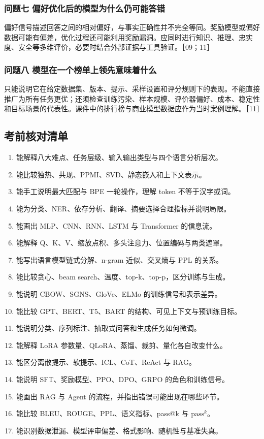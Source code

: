 \documentclass[UTF8,a4paper,zihao=-4,fontset=windows]{ctexart}
\begin{document}
\subsubsection*{问题七 偏好优化后的模型为什么仍可能答错}
偏好信号描述回答之间的相对偏好，与事实正确性并不完全等同。奖励模型或偏好数据可能有偏差，优化过程还可能利用奖励漏洞。应同时进行知识、推理、忠实度、安全等多维评价，必要时结合外部证据与工具验证。［09；11］

\subsubsection*{问题八 模型在一个榜单上领先意味着什么}
只能说明它在给定数据集、版本、提示、采样设置和评分规则下的表现。不能直接推广为所有任务更优；还须检查训练污染、样本规模、评价器偏好、成本、稳定性和目标场景的代表性。课件中的排行榜与商业模型数据应作为当时案例理解。［11］

\subsection*{考前核对清单}
\begin{enumerate}
\item {}能解释八大难点、任务层级、输入输出类型与四个语言分析层次。
\item {}能比较独热、共现、PPMI、SVD、静态嵌入和上下文表示。
\item {}能手工说明最大匹配与 BPE 一轮操作，理解 token 不等于汉字或词。
\item {}能为分类、NER、依存分析、翻译、摘要选择合理指标并说明局限。
\item {}能画出 MLP、CNN、RNN、LSTM 与 Transformer 的信息流。
\item {}能解释 Q、K、V、缩放点积、多头注意力、位置编码与两类遮罩。
\item {}能写出语言模型链式分解、n-gram 近似、交叉熵与 PPL 的关系。
\item {}能比较贪心、beam search、温度、top-k、top-p，区分训练与生成。
\item {}能说明 CBOW、SGNS、GloVe、ELMo 的训练信号和表示差异。
\item {}能比较 GPT、BERT、T5、BART 的结构、可见上下文与预训练目标。
\item {}能说明分类、序列标注、抽取式问答和生成任务如何微调。
\item {}能解释 LoRA 参数量、QLoRA、蒸馏、裁剪、量化各自改变什么。
\item {}能区分离散提示、软提示、ICL、CoT、ReAct 与 RAG。
\item {}能说明 SFT、奖励模型、PPO、DPO、GRPO 的角色和训练信号。
\item {}能画出 RAG 与 Agent 的流程，并指出错误可能出现在哪些环节。
\item {}能比较 BLEU、ROUGE、PPL、语义指标、pass@k 与 $\mathrm{pass}^{k}$。
\item {}能识别数据泄漏、模型评审偏差、格式影响、随机性与基准失真。
\end{enumerate}
\end{document}
